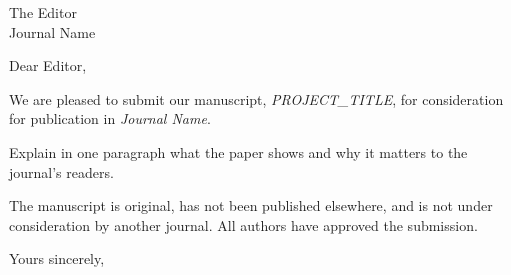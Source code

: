 \documentclass[11pt]{letter}
\begin{document}
\begin{letter}{The Editor\\ Journal Name}

\opening{Dear Editor,}

We are pleased to submit our manuscript, \emph{{{PROJECT_TITLE}}}, for
consideration for publication in \emph{Journal Name}.

Explain in one paragraph what the paper shows and why it matters to the
journal's readers.

The manuscript is original, has not been published elsewhere, and is not under
consideration by another journal. All authors have approved the submission.

\closing{Yours sincerely,}

\end{letter}
\end{document}
